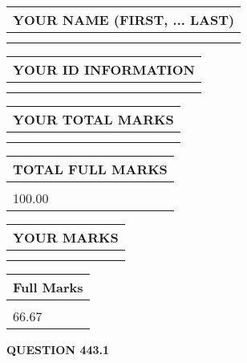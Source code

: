 \documentclass{ctexart}
\begin{document}
   
   
   
\newpage 
\setcounter{page}{ 
   443001 } 
   
   
   
   
\noindent\begin{tabular}{|l|}
\hline
YOUR NAME (FIRST, ... LAST)  \\
\hline
 \\ 
 \\ 
\hline
\end{tabular}
\hspace{0.05in} \begin{tabular}{|l|}
\hline
 YOUR   ID   INFORMATION  \\
\hline
 \\ 
 \\ 
\hline
\end{tabular}
   
   
\vspace{0.2in}\noindent\begin{tabular}{|l|}
\hline
YOUR TOTAL MARKS  \\
\hline
 \\ 
 \\ 
\hline
\end{tabular}
\hspace{0.05in} \begin{tabular}{|l|}
\hline
TOTAL FULL MARKS  \\
\hline
 \\ 
100.00 \\
\hline
\end{tabular}
   
   
 \vspace{0.2in}
 
 
 
 
   
   
  
\vspace{0.2in}
  
\noindent\begin{tabular}{|l|}
\hline
 YOUR MARKS  \\
\hline
 \\ 
 \\ 
\hline
\end{tabular}
\hspace{0.05in} \begin{tabular}{|l|}
\hline
 Full Marks  \\
\hline
 \\ 
66.67 \\
\hline
\end{tabular}
{\textbf{\Large{QUESTION
443.1 
}}}
  
\end{document}
